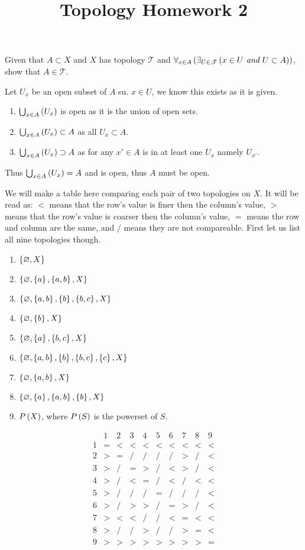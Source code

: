 \documentclass{article}
\title{Topology Homework 2}
\begin{document}
\maketitle

 Given that $A \subset X$ and $X$ has topology $\mathscr T$ and $\forall_{x\in A}\left( \exists_{U\in\mathscr T}\left( {x \in U \textit{ and } U \subset A} \right) \right)$, show that $A \in \mathscr T$.

Let $U_x$ be an open subset of $A$ su. $x \in U$, we know this exists as it is given.
\begin{enumerate}
\item $\bigcup_{x\in A}^{} \left( {U_x} \right)$ is open as it is the union of open sets.
\item $\bigcup_{x\in A}^{} \left( {U_x} \right) \subset A$ as all $U_x \subset A$.
\item $\bigcup_{x\in A}^{} \left( {U_x} \right) \supset A$ as for any $x'\in A$ is in at least one $U_x$ namely $U_{x'}$.
\end{enumerate}
Thus $\bigcup_{x\in A}^{} \left( {U_x} \right) = A$ and is open, thus $A$ must be open.

 We will make a table here comparing each pair of two topologies on $X$. It will be read as: $<$ means that the row's value is finer then the column's value, $>$ means that the row's value is coarser then the column's value, $=$ means the row and column are the same, and $/$ means they are not compareable. First let us list all nine topologies though.

\begin{enumerate}
\item $\left\{ {\varnothing, X} \right\}$
\item $\left\{ {\varnothing, \left\{ {a} \right\}, \left\{ {a,b} \right\}, X} \right\}$
\item $\left\{ {\varnothing, \left\{ {a,b} \right\}, \left\{ {b} \right\}, \left\{ {b,c} \right\}, X} \right\}$
\item $\left\{ {\varnothing, \left\{ {b} \right\}, X} \right\}$
\item $\left\{ {\varnothing, \left\{ {a} \right\}, \left\{ {b,c} \right\}, X} \right\}$
\item $\left\{ {\varnothing, \left\{ {a,b} \right\}, \left\{ {b} \right\}, \left\{ {b,c} \right\},\left\{ {c} \right\}, X} \right\}$
\item $\left\{ {\varnothing, \left\{ {a,b} \right\}, X} \right\}$
\item $\left\{ {\varnothing, \left\{ {a} \right\}, \left\{ {a,b} \right\}, \left\{ {b} \right\}, X} \right\}$
\item $P \left( X \right)$, where $P \left( S \right)$ is the powerset of $S$.
\end{enumerate}

\[
\begin{array}{c|c|c|c|c|c|c|c|c|c}
&1&2&3&4&5&6&7&8&9\\\hline 1
&=&<&<&<&<&<&<&<&<\\\hline 2
&>&=&/&/&/&/&>&/&<\\\hline 3
&>&/&=&>&/&<&>&/&<\\\hline 4
&>&/&<&=&/&<&/&<&<\\\hline 5
&>&/&/&/&=&/&/&/&<\\\hline 6
&>&/&>&>&/&=&>&/&<\\\hline 7
&>&<&<&/&/&<&=&<&<\\\hline 8
&>&/&/&>&/&/&>&=&<\\\hline 9
&>&>&>&>&>&>&>&>&=
\end{array}
\]
\end{document}
